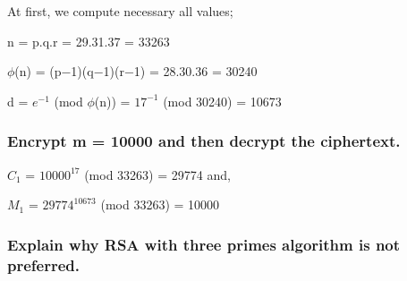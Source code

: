 \documentclass[11pt]{article}
\begin{document}
At first, we compute necessary all values;\\

\begin{center}
n = p.q.r = 29.31.37 = 33263\\
\end{center}
    
\begin{center}
$\phi $(n) = (p−1)(q−1)(r−1) = 28.30.36 = 30240\\
\end{center}
\begin{center}
    d = $e^{-1}$ (mod $\phi$(n)) = $17^{-1}$ (mod 30240) = 10673\\

\end{center}


\subsubsection{\textbf{Encrypt m = 10000 and then decrypt the ciphertext.}}


\begin{center}
    $C_{1}$ = $10000^{17}$ (mod 33263) = 29774 and,
\end{center}

\begin{center}
    $M_{1}$ = $29774^{10673}$ (mod 33263) = 10000
 
\end{center}


\subsubsection{\textbf{Explain why RSA with three primes algorithm is not preferred.}}
\end{document}
